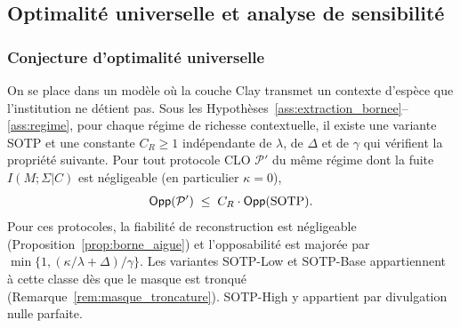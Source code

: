 \subsection{Optimalit\'e universelle et analyse de sensibilit\'e}
\label{subsec:optimalite_sensibilite}
\begin{sloppypar}
\subsubsection{Conjecture d'optimalit\'e universelle}
\label{subsubsec:optimalite_universelle}

\begin{conjecture}\label{conj:optimalite_universelle}
\label{thm:optimalite_universelle}%
On se place dans un mod\`ele o\`u la couche Clay transmet un contexte d'esp\`ece que l'institution ne
d\'etient pas. Sous les Hypoth\`eses~\ref{ass:extraction_bornee}--\ref{ass:regime}, pour chaque
r\'egime de richesse contextuelle, il existe une variante SOTP et une
constante $C_R \geq 1$ ind\'ependante de $\lambda$, de $\Delta$ et de $\gamma$ qui v\'erifient la propri\'et\'e suivante. Pour tout
protocole CLO $\mathcal{P}'$ du m\^eme r\'egime dont la fuite $I(M;\Sigma|C)$ est n\'egligeable
(en particulier $\kappa = 0$),
\begin{equation}
\mathsf{Opp}(\mathcal{P}') \;\leq\; C_R \cdot \mathsf{Opp}(\text{SOTP}).
\label{eq:optimalite_universelle}
\end{equation}
Pour ces protocoles, la fiabilit\'e de reconstruction est n\'egligeable (Proposition~\ref{prop:borne_aigue})
et l'opposabilit\'e est major\'ee par $\min\{1, (\kappa/\lambda + \Delta)/\gamma\}$. Les
variantes SOTP-Low et SOTP-Base appartiennent \`a cette classe d\`es que le masque est tronqu\'e
(Remarque~\ref{rem:masque_troncature}). SOTP-High y appartient par divulgation nulle parfaite.
\end{conjecture}


\end{sloppypar}
